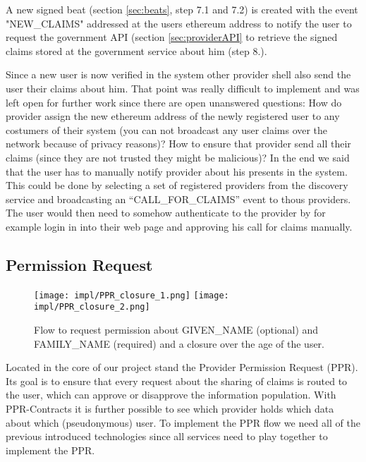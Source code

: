 A new signed beat (section \ref{sec:beats}, step 7.1 and 7.2) is created with the event "NEW\_CLAIMS" addressed at the users ethereum address to notify the user to request the government API (section \ref{sec:providerAPI} to retrieve the signed claims stored at the government service about him (step 8.). 

Since a new user is now verified in the system other provider shell also send the user their claims about him. That point was really difficult to implement and was left open for further work since there are open unanswered questions: How do provider assign the new ethereum address of the newly registered user to any costumers of their system (you can not broadcast any user claims over the network because of privacy reasons)? How to ensure that provider send all their claims (since they are not trusted they might be malicious)? 
In the end we said that the user has to manually notify provider about his presents in the system. This could be done by selecting a set of registered providers from the discovery service and broadcasting an “CALL\_FOR\_CLAIMS” event to thous providers. The user would then need to somehow authenticate to the provider by for example login in into their web page and approving his call for claims manually. 

\subsection{Permission Request}
\label{sec:ppr}

\begin{figure}
\texttt{[image: impl/PPR\_closure\_1.png]}
\texttt{[image: impl/PPR\_closure\_2.png]}
\centering
\caption{Flow to request permission about GIVEN\_NAME (optional) and FAMILY\_NAME (required) and a closure over the age of the user.}
\label{fig:ppr}
\end{figure}

Located in the core of our project stand the Provider Permission Request (PPR). Its goal is to ensure that every request about the sharing of claims is routed to the user, which can approve or disapprove the information population. With PPR-Contracts it is further possible to see which provider holds which data about which (pseudonymous) user. To implement the PPR flow we need all of the previous introduced technologies since all services need to play together to implement the PPR. 

